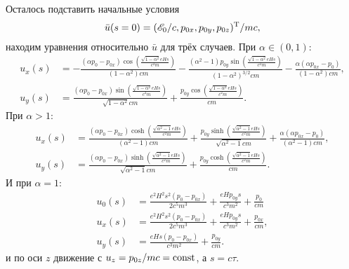 Осталось подставить начальные условия
\begin{equation*}
	\bar{u}(s=0) = (\mathscr{E}_0/c, p_{0x}, p_{0y}, p_{0z})^{\text{T}} / mc,
\end{equation*}
находим уравнения относительно $\bar{u}$ для трёх случаев. При $\alpha \in (0, 1)$:
\begin{align*}
	u_x(s) &= -\frac{(\alpha  p_0-p_{0x}) \cos \left(\frac{\sqrt{1-\alpha ^2} e H s}{c^2 m}\right)}{\left(1-\alpha ^2\right) c m}-\frac{\left(\alpha ^2-1\right) p_{0y} \sin \left(\frac{\sqrt{1-\alpha ^2} e H s}{c^2 m}\right)}{\left(1-\alpha ^2\right)^{3/2} c m}-\frac{\alpha  (\alpha  p_{0x}-p_0)}{\left(1-\alpha ^2\right) c m} ,
	\\
	u_y(s) &= \frac{(\alpha  p_0-p_{0x}) \sin \left(\frac{\sqrt{1-\alpha ^2} e H s}{c^2 m}\right)}{\sqrt{1-\alpha ^2} c m}+\frac{p_{0y} \cos \left(\frac{\sqrt{1-\alpha ^2} e H s}{c^2 m}\right)}{c m}.
\end{align*}
При $\alpha > 1$:
\begin{align*}
	u_x(s) &= \frac{(\alpha  p_0-p_{0x}) \cosh \left(\frac{\sqrt{\alpha ^2-1} e H s}{c^2 m}\right)}{\left(\alpha ^2-1\right) c m}+\frac{p_{0y} \sinh \left(\frac{\sqrt{\alpha ^2-1} e H s}{c^2 m}\right)}{\sqrt{\alpha ^2-1} c m}+\frac{\alpha  (\alpha  p_{0x}-p_0)}{\left(\alpha ^2-1\right) c m},
	\\
	u_y(s) &= \frac{(\alpha  p_0-p_{0x}) \sinh \left(\frac{\sqrt{\alpha ^2-1} e H s}{c^2 m}\right)}{\sqrt{\alpha ^2-1} c m}+\frac{p_{0y} \cosh \left(\frac{\sqrt{\alpha ^2-1} e H s}{c^2 m}\right)}{c m}.
\end{align*}
И при $\alpha = 1$:
\begin{align*}
	u_0(s) &= \frac{e^2 H^2 s^2 (p_0-p_{0x})}{2 c^5 m^3}+\frac{e H p_{0y} s}{c^3 m^2}+\frac{p_0}{c m} \\
	u_x(s) &= \frac{e^2 H^2 s^2 (p_0-p_{0x})}{2 c^5 m^3}+\frac{e H p_{0y} s}{c^3 m^2}+\frac{p_{0x}}{c m}, \\
	u_y(s) &= \frac{e H s (p_0-p_{0x})}{c^3 m^2}+\frac{p_{0y}}{c m}.
\end{align*}
и по оси $z$ движение с $u_z = p_{0z} / mc = \text{const}$, а $s = c \tau$.




